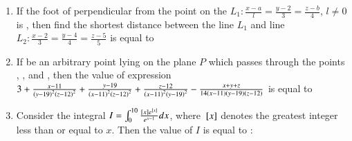 \documentclass[journal,12pt,onecolumn]{IEEEtran}
\theoremstyle{remark}
\begin{document}
\begin{enumerate}
\item If the foot of perpendicular from the point  on the $L_1:\frac{x-a}{l}=\frac{y-2}{3}=\frac{z-b}{4}$, $l\neq 0$ is , then find the shortest distance between the line $L_1$ and line $L_2:\frac{x-2}{3}=\frac{y-4}{4}=\frac{z-5}{5}$ is equal to

\hfill{}
\begin{enumerate}
\end{enumerate}

\item If  be an arbitrary point lying on the plane $P$ which passes through the points , , and , then the value of expression $3+\frac{x-11}{\left(y-19\right)^2\left(z-12\right)^2}+\frac{y-19}{\left(x-11\right)^2\left(z-12\right)^2}+\frac{z-12}{\left(x-11\right)^2\left(y-19\right)^2} - \frac{x+y+z}{14\left(x-11\right)\left(y-19\right)\left(z-12\right)}$ is equal to

\hfill{}
\begin{enumerate}
\end{enumerate}

\item Consider the integral $I=\int_{0}^{10}\frac{{}\left[x\right]e^{{}\left[x\right]}}{e^{x-1}}dx$, where ${}\left[x\right]$ denotes the greatest integer less than or equal to $x$. Then the value of $I$ is equal to :

\hfill{}
\begin{enumerate}
\end{enumerate}


\end{enumerate}
\end{document}
